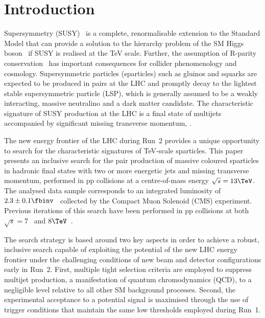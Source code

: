 \section{Introduction}
\label{sec:introduction}

Supersymmetry (SUSY)~\cite{ref:SUSY-1, ref:SUSY0, ref:SUSY1,
  ref:SUSY2, ref:SUSY3, ref:SUSY4, ref:hierarchy1, ref:hierarchy2}
is a complete, renormalisable extension to the Standard Model
that can provide a solution to the hierarchy problem of the SM Higgs
boson~\cite{ref:atlashiggsdiscovery, ref:cmshiggsdiscovery} if
SUSY is realised at the TeV scale. Further, the assumption of R-parity
conservation~\cite{Farrar:1978xj} has important consequences for
collider phenomenology and cosmology. Supersymmetric particles
(sparticles) such as gluinos and squarks are expected to be produced
in pairs at the LHC and promptly decay to the lightest stable
supersymmetric particle (LSP), which is generally assumed to be a
weakly interacting, massive neutralino and a dark matter
candidate. The characteristic signature of SUSY production at the LHC
is a final state of multijets accompanied by significant missing
transverse momentum, \ptvecmiss.

The new energy frontier of the LHC during Run~2 provides a unique
opportunity to search for the characteristic signatures of TeV-scale
sparticles. This paper presents an inclusive search
for the pair production of massive coloured sparticles in hadronic
final states with two or more energetic jets and missing transverse
momentum, performed in pp collisions at a centre-of-mass energy
$\sqrt{s} = 13\TeV$. The analysed data sample corresponds to an
integrated luminosity of $2.3 \pm 0.1 \fbinv$~\cite{lumi} collected by
the Compact Muon Solenoid (CMS) experiment. Previous iterations of
this search have been performed in pp collisions at both $\sqrt{s} =
7$~\cite{RA1Paper, RA1Paper2011, RA1Paper2011FULL} and
$8\TeV$~\cite{RA1Paper2012}.

The search strategy is based around two key aspects in order to
achieve a robust, inclusive search capable of exploiting the potential
of the new LHC energy frontier under the challenging conditions of new
beam and detector configurations early in Run~2. First, multiple tight
selection criteria are employed to suppress multijet production, a
manifestation of quantum chromodynamics (QCD), to a negligible level
relative to all other SM background processes. Second, the
experimental acceptance to a potential signal is maximised through the
use of trigger conditions that maintain the same low thresholds
employed during Run~1.

